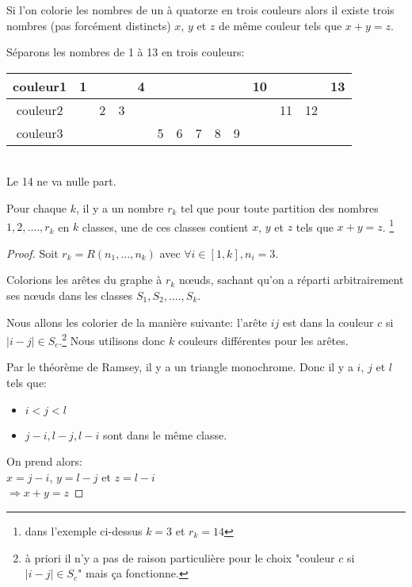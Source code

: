 \begin{mytheo} 
    Si l'on colorie les nombres de un à quatorze en trois couleurs alors il existe trois nombres (pas forcément distincts) $x$, $y$ et $z$ de m\^eme couleur tels que $x+y=z$.
\end{mytheo}

\begin{myexem}
Séparons les nombres de 1 à 13 en trois couleurs:
\vspace*{0.2cm}

    \begin{tabular}{|c|c|c|c|c|c|c|c|c|c|c|c|c|c|}
        \hline
       couleur1 & 1 &  &  & 4  &  &  &  &  &  & 10 &  &  & 13\\

       \hline
       couleur2 &  & 2 & 3 &  &  &  &  &  &  &  & 11 & 12 &\\

       \hline
       couleur3 &  &  &  &  & 5 & 6 & 7 & 8 & 9 &  &  &  &\\

        \hline
      \end{tabular} \\
      Le 14 ne va nulle part.
\end{myexem}


\begin{mytheo} 
Pour chaque $k$, il y a un nombre $r_k$ tel que pour toute partition des nombres $1,2,....,r_k$ en $k$ classes, une de ces classes contient $x$, $y$ et $z$ tels que $x+y=z$. \footnote{dans l'exemple ci-dessus $k = 3$ et $r_k = 14$}
\begin{proof}
Soit $r_k = R(n_1,...,n_k)$ avec $\forall i \in [1 , k], n_i = 3 $.

Colorions les ar\^etes du graphe à $r_k$ nœuds, sachant qu'on a réparti arbitrairement ses nœuds dans les classes $S_1 ,S_2,....,S_k$.

Nous allons les colorier de la manière suivante: l'ar\^ete $ij$ est dans la couleur $c$ si $\mid i-j \mid \in S_c $.\footnote{à priori il n'y a pas de raison particulière pour le choix "couleur $c$ si $\mid i-j \mid \in S_c $" mais ça fonctionne.} Nous utilisons donc $k$ couleurs différentes pour les arêtes.

Par le théorème de Ramsey, il y a un triangle monochrome.
Donc il y a $i$, $j$ et $l$ tels que:
\begin{itemize}
\item
$i < j < l$
\item
$j-i, l-j, l-i$ sont dans le m\^eme classe.
\end{itemize}

On prend alors:\\
$x = j-i$, $y = l-j$ et $z = l-i$\\
$\Rightarrow x+y=z$

\end{proof}
\end{mytheo}


